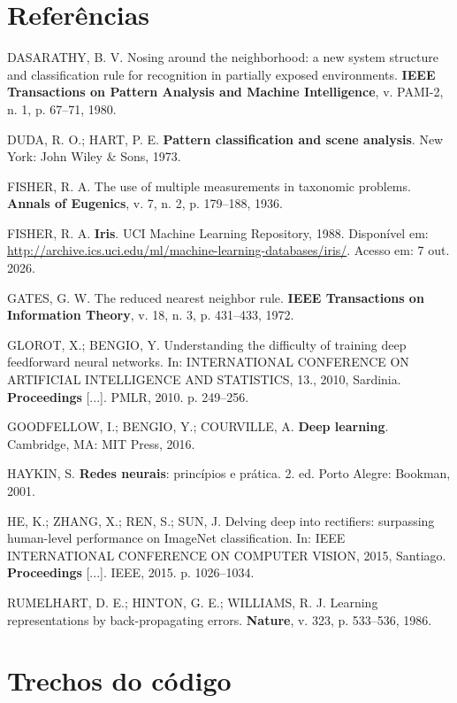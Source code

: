 \documentclass[12pt,a4paper]{article}
\begin{document}
\section*{Referências}
\begin{singlespace}
\setlength{\parindent}{0pt}
\setlength{\parskip}{0.5\baselineskip}
\raggedright

DASARATHY, B. V. Nosing around the neighborhood: a new system structure and classification rule for
recognition in partially exposed environments. \textbf{IEEE Transactions on Pattern Analysis and
Machine Intelligence}, v. PAMI-2, n. 1, p. 67--71, 1980.

DUDA, R. O.; HART, P. E. \textbf{Pattern classification and scene analysis}. New York: John Wiley \&
Sons, 1973.

FISHER, R. A. The use of multiple measurements in taxonomic problems. \textbf{Annals of Eugenics},
v. 7, n. 2, p. 179--188, 1936.

FISHER, R. A. \textbf{Iris}. UCI Machine Learning Repository, 1988. Disponível em:
\url{http://archive.ics.uci.edu/ml/machine-learning-databases/iris/}. Acesso em: 7 out. 2026.

GATES, G. W. The reduced nearest neighbor rule. \textbf{IEEE Transactions on Information Theory},
v. 18, n. 3, p. 431--433, 1972.

GLOROT, X.; BENGIO, Y. Understanding the difficulty of training deep feedforward neural networks. In:
INTERNATIONAL CONFERENCE ON ARTIFICIAL INTELLIGENCE AND STATISTICS, 13., 2010, Sardinia.
\textbf{Proceedings} [...]. PMLR, 2010. p. 249--256.

GOODFELLOW, I.; BENGIO, Y.; COURVILLE, A. \textbf{Deep learning}. Cambridge, MA: MIT Press,
2016.

HAYKIN, S. \textbf{Redes neurais}: princípios e prática. 2. ed. Porto Alegre: Bookman,
2001.

HE, K.; ZHANG, X.; REN, S.; SUN, J. Delving deep into rectifiers: surpassing human-level performance
on ImageNet classification. In: IEEE INTERNATIONAL CONFERENCE ON COMPUTER VISION, 2015, Santiago.
\textbf{Proceedings} [...]. IEEE, 2015. p. 1026--1034.

RUMELHART, D. E.; HINTON, G. E.; WILLIAMS, R. J. Learning representations by back-propagating errors.
\textbf{Nature}, v. 323, p. 533--536, 1986.
\end{singlespace}

\appendix
\section{Trechos do código}
\label{ap:codigo}
\end{document}
